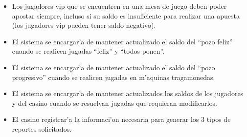 \begin{itemize}
\item {} 

 Los jugadores vip que se encuentren en una mesa de juego deben poder apostar siempre, incluso si su saldo es insuficiente para realizar una apuesta (los jugadores vip pueden tener saldo negativo).

\item {} 

 El sistema se encargar'a de mantener actualizado el saldo del ``pozo feliz'' cuando se realicen jugadas ``feliz'' y ``todos ponen''.
 
\item {} 

 El sistema se encargar'a de mantener actualizado el saldo del ``pozo progresivo'' cuando se realicen jugadas en m'aquinas tragamonedas.

\item {} 

 El sistema se encargar'a de mantener actualizados los saldos de los jugadores y del casino cuando se resuelvan jugadas que requieran modificarlos.

\item {} 
 
 El casino registrar'a la informaci'on necesaria para generar los 3 tipos de reportes solicitados.

\end{itemize}



